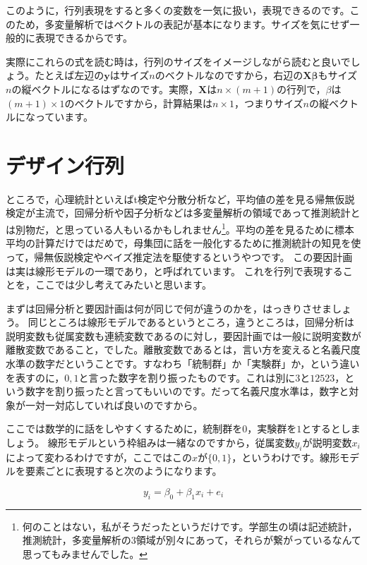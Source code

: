 \documentclass{ltjsbook}
\begin{document}
このように，行列表現をすると多くの変数を一気に扱い，表現できるのです。このため，多変量解析ではベクトルの表記が基本になります。サイズを気にせず一般的に表現できるからです。

実際にこれらの式を読む時は，行列のサイズをイメージしながら読むと良いでしょう。たとえば左辺の$\bm{y}$はサイズ$n$のベクトルなのですから，右辺の$\bm{X \beta}$もサイズ$n$の縦ベクトルになるはずなのです。実際，$\bm{X}$は$n \times (m+1)$の行列で，$\beta$は$(m+1) \times 1$のベクトルですから，計算結果は$n \times 1$，つまりサイズ$n$の縦ベクトルになっています。

\section{デザイン行列}
\label{designMatrix}
ところで，心理統計といえばt検定や分散分析など，平均値の差を見る帰無仮説検定が主流で，回帰分析や因子分析などは多変量解析の領域であって推測統計とは別物だ，と思っている人もいるかもしれません\footnote{何のことはない，私がそうだったというだけです。学部生の頃は記述統計，推測統計，多変量解析の3領域が別々にあって，それらが繋がっているなんて思ってもみませんでした。}。平均の差を見るために標本平均の計算だけではだめで，母集団に話を一般化するために推測統計の知見を使って，帰無仮説検定やベイズ推定法を駆使するというやつです。
この要因計画は実は線形モデルの一環であり，と呼ばれています。
これを行列で表現することを，ここでは少し考えてみたいと思います。

まずは回帰分析と要因計画は何が同じで何が違うのかを，はっきりさせましょう。
同じところは線形モデルであるというところ，違うところは，回帰分析は説明変数も従属変数も連続変数であるのに対し，要因計画では一般に説明変数が離散変数であること，でした。離散変数であるとは，言い方を変えると名義尺度水準の数字だということです。すなわち「統制群」か「実験群」か，という違いを表すのに，$0,1$と言った数字を割り振ったものです。これは別に$3$と$12523$，という数字を割り振ったと言ってもいいのです。だって名義尺度水準は，数字と対象が一対一対応していれば良いのですから。

ここでは数学的に話をしやすくするために，統制群を$0$，実験群を$1$とするとしましょう。
線形モデルという枠組みは一緒なのですから，従属変数$y_i$が説明変数$x_i$によって変わるわけですが，ここではこの$x$が$ \{ 0, 1 \}$，というわけです。線形モデルを要素ごとに表現すると次のようになります。

\[ y_i = \beta_0 + \beta_1 x_i + e_i \]
\end{document}
